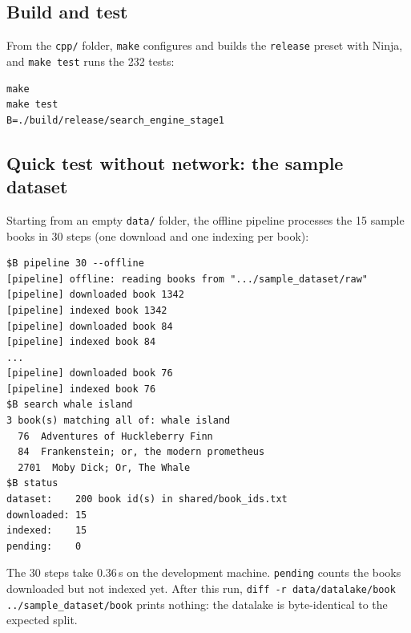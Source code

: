 \documentclass[11pt,a4paper]{article}
\newcommand{\code}[1]{\texttt{#1}}
\begin{document}
\subsection{Build and test}
From the \code{cpp/} folder, \code{make} configures and builds the \code{release} preset with Ninja,
and \code{make test} runs the 232 tests:
\begin{lstlisting}[style=shell]
make
make test
B=./build/release/search_engine_stage1
\end{lstlisting}

\subsection{Quick test without network: the sample dataset}\label{sec:quick}
Starting from an empty \code{data/} folder, the offline pipeline processes the 15 sample books in 30
steps (one download and one indexing per book):
\begin{lstlisting}[style=shell]
$B pipeline 30 --offline
[pipeline] offline: reading books from ".../sample_dataset/raw"
[pipeline] downloaded book 1342
[pipeline] indexed book 1342
[pipeline] downloaded book 84
[pipeline] indexed book 84
...
[pipeline] downloaded book 76
[pipeline] indexed book 76
$B search whale island
3 book(s) matching all of: whale island
  76  Adventures of Huckleberry Finn
  84  Frankenstein; or, the modern prometheus
  2701  Moby Dick; Or, The Whale
$B status
dataset:    200 book id(s) in shared/book_ids.txt
downloaded: 15
indexed:    15
pending:    0
\end{lstlisting}
The 30 steps take 0.36\,s on the development machine. \code{pending} counts the books downloaded but
not indexed yet. After this run, \code{diff -r data/datalake/book ../sample\_dataset/book} prints nothing: the datalake
is byte-identical to the expected split.
\end{document}
